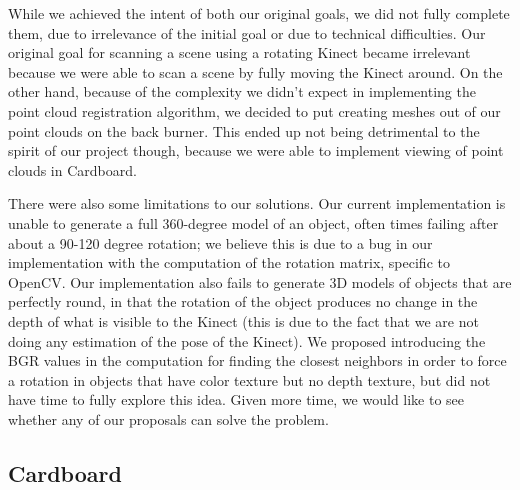 \documentclass[11pt,oneside,english]{article}
\begin{document}
While we achieved the intent of both our original goals, we did not fully
complete them, due to irrelevance of the initial goal or due to technical
difficulties. Our original goal for scanning a scene using a rotating Kinect
became irrelevant because we were able to scan a scene by fully moving the
Kinect around. On the other hand, because of the complexity we didn't expect in
implementing the point cloud registration algorithm, we decided to put creating
meshes out of our point clouds on the back burner. This ended up not being
detrimental to the spirit of our project though, because we were able to
implement viewing of point clouds in Cardboard.

There were also some limitations to our solutions. Our current implementation is
unable to generate a full 360-degree model of an object, often times failing
after about a 90-120 degree rotation; we believe this is due to a bug in our
implementation with the computation of the rotation matrix, specific to OpenCV.
Our implementation also fails to generate 3D models of objects that are
perfectly round, in that the rotation of the object produces no change in the
depth of what is visible to the Kinect (this is due to the fact that we are not
doing any estimation of the pose of the Kinect). We proposed introducing the BGR
values in the computation for finding the closest neighbors in order to force a
rotation in objects that have color texture but no depth texture, but did not
have time to fully explore this idea. Given more time, we would like to see
whether any of our proposals can solve the problem.


\subsection{Cardboard}
\end{document}
